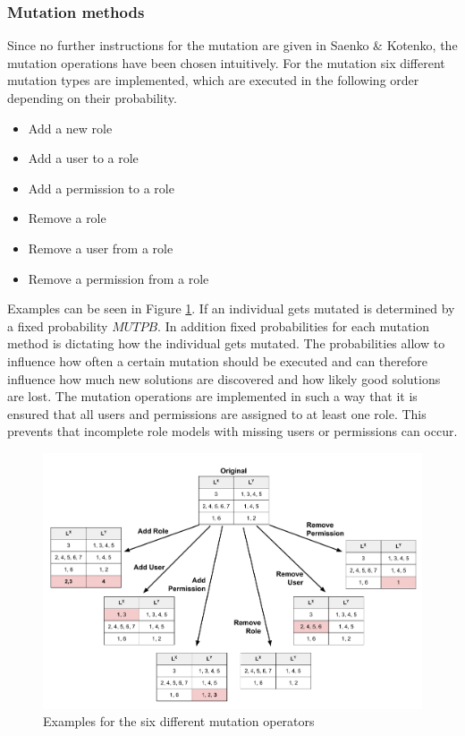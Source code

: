         \subsubsection{Mutation methods}
        Since no further instructions for the mutation are given in Saenko \& Kotenko\cite{saenko2012design}, the mutation operations have been chosen intuitively. For the mutation six different mutation types are implemented, which are executed in the following order depending on their probability.
        \begin{itemize}
            \setlength{\itemsep}{1pt}
            \item Add a new role
            \item Add a user to a role
            \item Add a permission to a role
            \item Remove a role
            \item Remove a user from a role
            \item Remove a permission from a role
        \end{itemize}
        Examples can be seen in Figure \ref{fig:mutationOperations}. If an individual gets mutated is determined by a fixed probability $MUTPB$. In addition fixed probabilities for each mutation method is dictating how the individual gets mutated. The probabilities allow to influence how often a certain mutation should be executed and can therefore influence how much new solutions are discovered and how likely good solutions are lost. The mutation operations are implemented in such a way that it is ensured that all users and permissions are assigned to at least one role. This prevents that incomplete role models with missing users or permissions can occur.

        \begin{figure}
            \centering
            \includegraphics[scale=0.3]{./Figures/Mutations}
            \caption{Examples for the six different mutation operators}
            \label{fig:mutationOperations}
        \end{figure}
